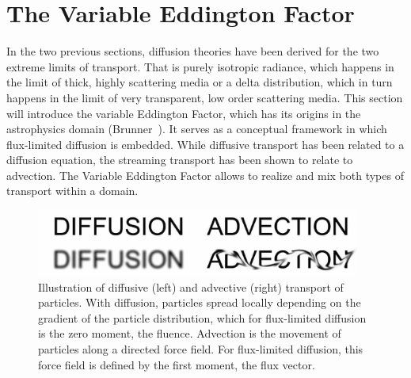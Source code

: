 \section{The Variable Eddington Factor}
\label{sec:fld_vef}

In the two previous sections, diffusion theories have been derived for the two extreme limits of transport. That is purely isotropic radiance, which happens in the limit of thick, highly scattering media or a delta distribution, which in turn happens in the limit of very transparent, low order scattering media. This section will introduce the variable Eddington Factor, which has its origins in the astrophysics domain (Brunner~\cite{Brunner02}). It serves as a conceptual framework in which flux-limited diffusion is embedded. While diffusive transport has been related to a diffusion equation, the streaming transport has been shown to relate to advection. The Variable Eddington Factor allows to realize and mix both types of transport within a domain.
\begin{figure}[h]
\centering
\includegraphics[width=0.95\textwidth]{06_fld/figures/fig_diffusion_vs_advection.pdf}
\caption{Illustration of diffusive (left) and advective (right) transport of particles. With diffusion, particles spread locally depending on the gradient of the particle distribution, which for flux-limited diffusion is the zero moment, the fluence. Advection is the movement of particles along a directed force field. For flux-limited diffusion, this force field is defined by the first moment, the flux vector.}
\label{fig:fld_vef_advection_diffusion}
\end{figure}


